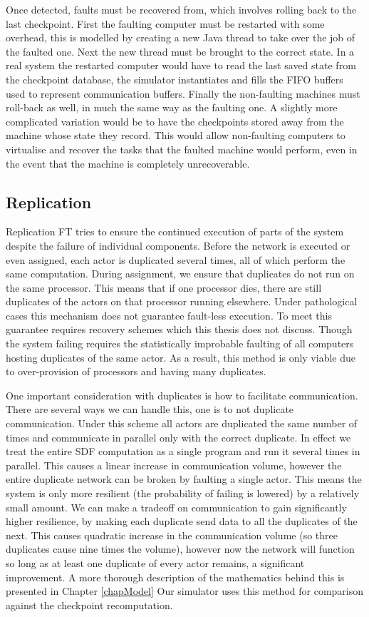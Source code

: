 Once detected, faults must be recovered from, which involves rolling back to the last checkpoint.
First the faulting computer must be restarted with some overhead, this is modelled by creating a new Java thread to take over the job of the faulted one.
Next the new thread must be brought to the correct state.
In a real system the restarted computer would have to read the last saved state from the checkpoint database, the simulator instantiates and fills the FIFO buffers used to represent communication buffers.
Finally the non-faulting machines must roll-back as well, in much the same way as the faulting one.
A slightly more complicated variation would be to have the checkpoints stored away from the machine whose state they record.
This would allow non-faulting computers to virtualise and recover the tasks that the faulted machine would perform, even in the event that the machine is completely unrecoverable.

\subsection{Replication}

Replication FT tries to ensure the continued execution of parts of the system despite the failure of individual components.
Before the network is executed or even assigned, each actor is duplicated several times, all of which perform the same computation.
During assignment, we ensure that duplicates do not run on the same processor.
This means that if one processor dies, there are still duplicates of the actors on that processor running elsewhere.
Under pathological cases this mechanism does not guarantee fault-less execution.
To meet this guarantee requires recovery schemes which this thesis does not discuss.
Though the system failing requires the statistically improbable faulting of all computers hosting duplicates of the same actor.
As a result, this method is only viable due to over-provision of processors and having many duplicates.

One important consideration with duplicates is how to facilitate communication.
There are several ways we can handle this, one is to not duplicate communication.
Under this scheme all actors are duplicated the same number of times and communicate in parallel only with the correct duplicate.
In effect we treat the entire SDF computation as a single program and run it several times in parallel.
This causes a linear increase in communication volume, however the entire duplicate network can be broken by faulting a single actor.
This means the system is only more resilient (the probability of failing is lowered) by a relatively small amount.
We can make a tradeoff on communication to gain significantly higher resilience, by making each duplicate send data to all the duplicates of the next.
This causes quadratic increase in the communication volume (so three duplicates cause nine times the volume), however now the network will function so long as at least one duplicate of every actor remains, a significant improvement.
A more thorough description of the mathematics behind this is presented in Chapter \ref{chapModel}
Our simulator uses this method for comparison against the checkpoint recomputation.

